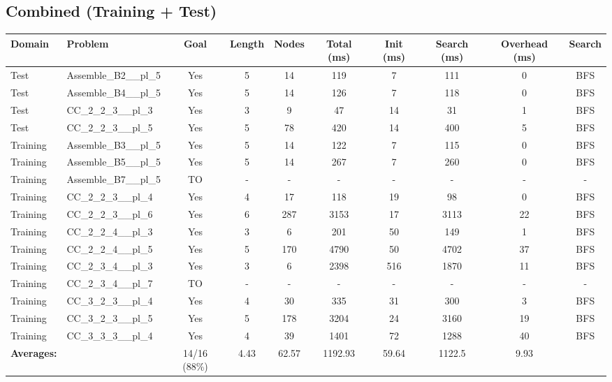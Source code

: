 \documentclass{article}
\begin{document}
\subsection*{Combined (Training + Test)}
\begin{tabular}{llcccccccc}
\toprule
Domain & Problem & Goal & Length & Nodes & Total (ms) & Init (ms) & Search (ms) & Overhead (ms) & Search \\
\midrule
Test & Assemble\_B2\_\_pl\_5 & Yes & 5 & 14 & 119 & 7 & 111 & 0 & BFS \\
Test & Assemble\_B4\_\_pl\_5 & Yes & 5 & 14 & 126 & 7 & 118 & 0 & BFS \\
Test & CC\_2\_2\_3\_\_pl\_3 & Yes & 3 & 9 & 47 & 14 & 31 & 1 & BFS \\
Test & CC\_2\_2\_3\_\_pl\_5 & Yes & 5 & 78 & 420 & 14 & 400 & 5 & BFS \\
Training & Assemble\_B3\_\_pl\_5 & Yes & 5 & 14 & 122 & 7 & 115 & 0 & BFS \\
Training & Assemble\_B5\_\_pl\_5 & Yes & 5 & 14 & 267 & 7 & 260 & 0 & BFS \\
Training & Assemble\_B7\_\_pl\_5 & TO & - & - & - & - & - & - & - \\
Training & CC\_2\_2\_3\_\_pl\_4 & Yes & 4 & 17 & 118 & 19 & 98 & 0 & BFS \\
Training & CC\_2\_2\_3\_\_pl\_6 & Yes & 6 & 287 & 3153 & 17 & 3113 & 22 & BFS \\
Training & CC\_2\_2\_4\_\_pl\_3 & Yes & 3 & 6 & 201 & 50 & 149 & 1 & BFS \\
Training & CC\_2\_2\_4\_\_pl\_5 & Yes & 5 & 170 & 4790 & 50 & 4702 & 37 & BFS \\
Training & CC\_2\_3\_4\_\_pl\_3 & Yes & 3 & 6 & 2398 & 516 & 1870 & 11 & BFS \\
Training & CC\_2\_3\_4\_\_pl\_7 & TO & - & - & - & - & - & - & - \\
Training & CC\_3\_2\_3\_\_pl\_4 & Yes & 4 & 30 & 335 & 31 & 300 & 3 & BFS \\
Training & CC\_3\_2\_3\_\_pl\_5 & Yes & 5 & 178 & 3204 & 24 & 3160 & 19 & BFS \\
Training & CC\_3\_3\_3\_\_pl\_4 & Yes & 4 & 39 & 1401 & 72 & 1288 & 40 & BFS \\
\textbf{Averages:} & & 14/16 (88\%) & 4.43 & 62.57 & 1192.93 & 59.64 & 1122.5 & 9.93 & \\
\bottomrule
\end{tabular}
\newpage
\end{document}
